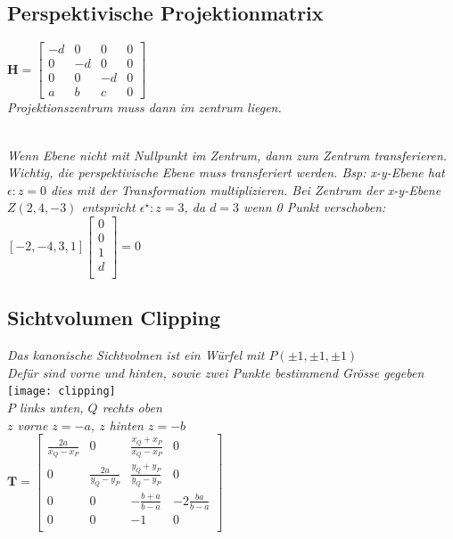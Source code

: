 \subsection{Perspektivische Projektionmatrix}

$\mathbf{H} = \begin{bmatrix}
    -d & 0 & 0 & 0 \\
    0 & -d & 0 & 0 \\
    0 & 0 & -d & 0 \\
    a & b & c & 0
\end{bmatrix}$ \\

\textit{Projektionszentrum muss dann im zentrum liegen.}

\textit{\\
    Wenn Ebene nicht mit Nullpunkt im Zentrum, dann zum Zentrum transferieren.
    Wichtig, die perspektivische Ebene muss transferiert werden. Bsp: x-y-Ebene hat $\epsilon: z = 0$
    dies mit der Transformation multiplizieren. Bei Zentrum der x-y-Ebene $Z(2,4,-3)$ entspricht
    $\epsilon^\star: z = 3$, da $d = 3$ wenn 0 Punkt verschoben:
}
$[-2, -4, 3, 1] \begin{bmatrix}
    0 \\ 0 \\ 1 \\ d \\
\end{bmatrix} = 0$

\subsection{Sichtvolumen Clipping}

\textit{Das kanonische Sichtvolmen ist ein Würfel mit $P(\pm 1, \pm 1, \pm 1)$} \\
\textit{Defür sind vorne und hinten, sowie zwei Punkte bestimmend Grösse gegeben} \\

\texttt{[image: clipping]} \\

\textit{$P$ links unten, $Q$ rechts oben} \\
\textit{$z$ vorne $z=-a$, $z$ hinten $z=-b$} \\

$\mathbf{T} = \begin{bmatrix}
    \frac{2a}{x_Q - x_P} & 0 & \frac{x_Q + x_P}{x_Q - x_P} & 0 \\
    0 & \frac{2a}{y_Q - y_P} & \frac{y_Q + y_P}{y_Q - y_P} & 0 \\
    0 & 0 & -\frac{b+a}{b-a} & -2\frac{ba}{b-a} \\
    0 & 0 & -1 & 0 \\
\end{bmatrix}$

